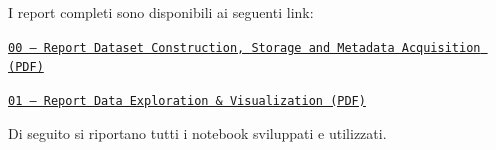 \documentclass[10pt]{extarticle}
\begin{document}
I report completi sono disponibili ai seguenti link:

\begin{center}
\href{https://github.com/elisabettaroviera/THESIS/blob/main/03%20-%20Report/01%20-%20Notebook/00%20-%20Report%20Dataset%20Construction%2C%20Storage%20and%20Metadata%20acquisition.pdf}
{\texttt{00 -- Report Dataset Construction, Storage and Metadata Acquisition (PDF)}}

\href{https://github.com/elisabettaroviera/THESIS/blob/main/03%20-%20Report/01%20-%20Notebook/01%20-%20Report%20Data%20Exploration%20%26%20Visualization.pdf}
{\texttt{01 -- Report Data Exploration \& Visualization (PDF)}} \\[6pt]

\end{center}

Di seguito si riportano tutti i notebook sviluppati e utilizzati.
\end{document}
